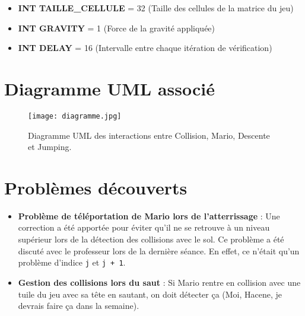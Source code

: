 \documentclass{report}
\begin{document}
\begin{itemize}
    \item \textbf{INT TAILLE\_CELLULE} = 32 (Taille des cellules de la matrice du jeu)
    \item \textbf{INT GRAVITY} = 1 (Force de la gravité appliquée)
    \item \textbf{INT DELAY} = 16 (Intervalle entre chaque itération de vérification)
\end{itemize}

\section{Diagramme UML associé}

\begin{figure}[H]  %
    \centering
    \texttt{[image: diagramme.jpg]} %
    \caption{Diagramme UML des interactions entre Collision, Mario, Descente et Jumping.}
    \label{fig:uml}
\end{figure}


\section{Problèmes découverts}

\begin{itemize}
    \item \textbf{Problème de téléportation de Mario lors de l'atterrissage} : Une correction a été apportée pour éviter qu'il ne se retrouve à un niveau supérieur lors de la détection des collisions avec le sol. Ce problème a été discuté avec le professeur lors de la dernière séance. En effet, ce n’était qu’un problème d’indice \texttt{j} et \texttt{j + 1}.
    \item \textbf{Gestion des collisions lors du saut} : Si Mario rentre en collision avec une tuile du jeu avec sa tête en sautant, on doit détecter ça (Moi, Hacene, je devrais faire ça dans la semaine).
\end{itemize}
\end{document}
